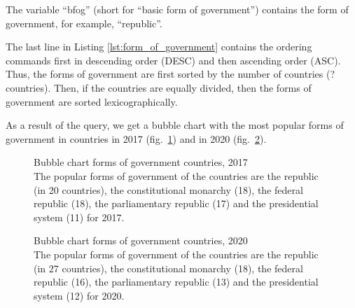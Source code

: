 
The variable ``bfog'' (short for ``basic form of government'') contains the form of government, for example, ``republic''.

The last line in Listing \ref{lst:form_of_government} contains the ordering commands first in descending order (DESC) and then ascending order (ASC). Thus, the forms of government are first sorted by the number of countries (?countries). Then, if the countries are equally divided, then the forms of government are sorted lexicographically\protect\footnotemark.



As a result of the query, we get a bubble chart with the most popular forms of government in countries in 2017 (fig.~\ref{fig:bubble_chart_forms_of_government_countries_2017}) and in 2020 (fig.~\ref{fig:bubble_chart_forms_of_government_countries_2020}).

\begin{figure}
	{
		\setlength{\fboxsep}{0pt}%
		\setlength{\fboxrule}{1pt}%
	}
	\caption{Bubble chart forms of government countries, 2017
		\\ The popular forms of government of the countries are the republic (in 20 countries), the constitutional monarchy (18), the federal republic (18), the parliamentary republic (17) and the presidential system (11) for 2017.
	}%
	\label{fig:bubble_chart_forms_of_government_countries_2017}%
\end{figure}

\begin{figure}
	{
		\setlength{\fboxsep}{0pt}%
		\setlength{\fboxrule}{1pt}%
	}
	\caption{Bubble chart forms of government countries, 2020
		\\ 
		The popular forms of government of the countries are the republic (in 27 countries), the constitutional monarchy (18), the federal republic (16), the parliamentary republic (13) and the presidential system (12) for 2020.
	}%
	\label{fig:bubble_chart_forms_of_government_countries_2020}%
\end{figure}

